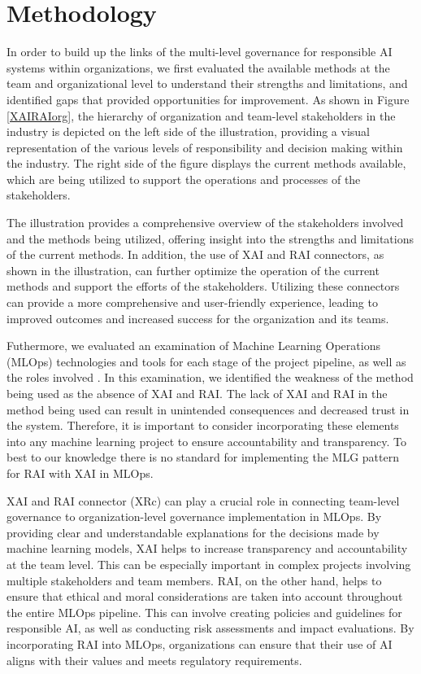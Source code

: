 \documentclass[conference]{IEEEtran}
\begin{document}
\section{Methodology}
In order to build up the links of the multi-level governance for responsible AI systems within organizations, we first evaluated the available methods at the team and organizational level to understand their strengths and limitations, and identified gaps that provided opportunities for improvement. As shown in Figure \ref{XAIRAIorg}, the hierarchy of organization and team-level stakeholders in the industry is depicted on the left side of the illustration, providing a visual representation of the various levels of responsibility and decision making within the industry. The right side of the figure displays the current methods available, which are being utilized to support the operations and processes of the stakeholders.

The illustration provides a comprehensive overview of the stakeholders involved and the methods being utilized, offering insight into the strengths and limitations of the current methods. In addition, the use of XAI and RAI connectors, as shown in the illustration, can further optimize the operation of the current methods and support the efforts of the stakeholders. Utilizing these connectors can provide a more comprehensive and user-friendly experience, leading to improved outcomes and increased success for the organization and its teams.

Futhermore, we evaluated an examination of Machine Learning Operations (MLOps) technologies and tools for each stage of the project pipeline, as well as the roles involved \cite{mlops-without}. In this examination, we identified the weakness of the method being used as the absence of XAI and RAI. The lack of XAI and RAI in the method being used can result in unintended consequences and decreased trust in the system. Therefore, it is important to consider incorporating these elements into any machine learning project to ensure accountability and transparency. To best to our knowledge there is no standard for implementing the MLG pattern for RAI with XAI in MLOps.

XAI and RAI connector (XRc) can play a crucial role in connecting team-level governance to organization-level governance implementation in MLOps. By providing clear and understandable explanations for the decisions made by machine learning models, XAI helps to increase transparency and accountability at the team level. This can be especially important in complex projects involving multiple stakeholders and team members. RAI, on the other hand, helps to ensure that ethical and moral considerations are taken into account throughout the entire MLOps pipeline. This can involve creating policies and guidelines for responsible AI, as well as conducting risk assessments and impact evaluations. By incorporating RAI into MLOps, organizations can ensure that their use of AI aligns with their values and meets regulatory requirements.
\end{document}
